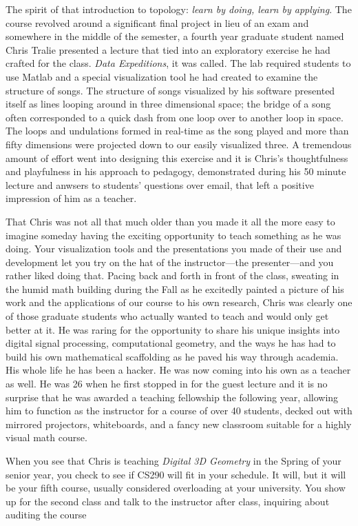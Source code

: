 \documentclass[../main.tex]{subfiles}
\begin{document}
The spirit of that introduction to topology: \textit{learn by doing, learn by applying}. The course revolved around a significant final project in lieu of an exam and somewhere in the middle of the semester, a fourth year graduate student named Chris Tralie presented a lecture that tied into an exploratory exercise he had crafted for the class. \textit{Data Expeditions}, it was called. The lab required students to use Matlab and a special visualization tool he had created to examine the structure of songs. The structure of songs visualized by his software presented itself as lines looping around in three dimensional space; the bridge of a song often corresponded to a quick dash from one loop over to another loop in space. The loops and undulations formed in real-time as the song played and more than fifty dimensions were projected down to our easily visualized three. A tremendous amount of effort went into designing this exercise and it is Chris's thoughtfulness and playfulness in his approach to pedagogy, demonstrated during his 50 minute lecture and anwsers to students' questions over email, that left a positive impression of him as a teacher.

That Chris was not all that much older than you made it all the more easy to imagine someday having the exciting opportunity to teach something as he was doing. Your visualization tools and the presentations you made of their use and development let you try on the hat of the instructor---the presenter---and you rather liked doing that. Pacing back and forth in front of the class, sweating in the humid math building during the Fall as he excitedly painted a picture of his work and the applications of our course to his own research, Chris was clearly one of those graduate students who actually wanted to teach and would only get better at it. He was raring for the opportunity to share his unique insights into digital signal processing, computational geometry, and the ways he has had to build his own mathematical scaffolding as he paved his way through academia. His whole life he has been a hacker. He was now coming into his own as a teacher as well. He was 26 when he first stopped in for the guest lecture and it is no surprise that he was awarded a teaching fellowship the following year, allowing him to function as the instructor for a course of over 40 students, decked out with mirrored projectors, whiteboards, and a fancy new classroom suitable for a highly visual math course.

When you see that Chris is teaching \textit{Digital 3D Geometry} in the Spring of your senior year, you check to see if CS290 will fit in your schedule. It will, but it will be your fifth course, usually considered overloading at your university. You show up for the second class and talk to the instructor after class, inquiring about auditing the course\textellipsis
 
\end{document}
